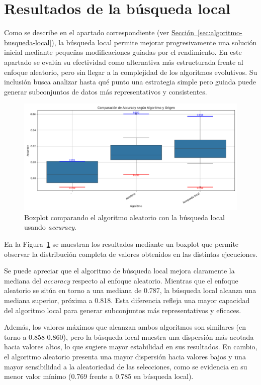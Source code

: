 \section{Resultados de la búsqueda local}\label{sec:resultados-busqueda-local}
Como se describe en el apartado correspondiente (ver \hyperref[sec:algoritmo-busqueda-local]{Sección~\ref*{sec:algoritmo-busqueda-local}}),
la búsqueda local permite mejorar progresivamente una solución inicial mediante pequeñas modificaciones guiadas por el rendimiento.
En este apartado se evalúa su efectividad como alternativa más estructurada frente al enfoque aleatorio, pero sin llegar a la complejidad de los algoritmos evolutivos.
Su inclusión busca analizar hasta qué punto una estrategia simple pero guiada puede generar subconjuntos de datos más representativos y consistentes.

\begin{figure}[htp]
    \centering
    \includegraphics[width=1\textwidth]{imagenes/evaluaciones/comparacion_aleatorio-bl}
    \caption{Boxplot comparando el algoritmo aleatorio con la búsqueda local usando \textit{accuracy}.}
    \label{fig:aleatorio-vs-busqueda-local}
\end{figure}

En la Figura~\ref{fig:aleatorio-vs-busqueda-local} se muestran los resultados mediante un boxplot que permite observar
la distribución completa de valores obtenidos en las distintas ejecuciones.

Se puede apreciar que el algoritmo de búsqueda local mejora claramente la mediana del \textit{accuracy} respecto al enfoque aleatorio.
Mientras que el enfoque aleatorio se sitúa en torno a una mediana de 0.787, la búsqueda local alcanza una mediana superior, próxima a 0.818.
Esta diferencia refleja una mayor capacidad del algoritmo local para generar subconjuntos más representativos y eficaces.

Además, los valores máximos que alcanzan ambos algoritmos son similares (en torno a 0.858-0.860),
pero la búsqueda local muestra una dispersión más acotada hacia valores altos, lo que sugiere mayor estabilidad en sus resultados.
En cambio, el algoritmo aleatorio presenta una mayor dispersión hacia valores bajos y una mayor sensibilidad a la aleatoriedad de las selecciones,
como se evidencia en su menor valor mínimo (0.769 frente a 0.785 en búsqueda local).

